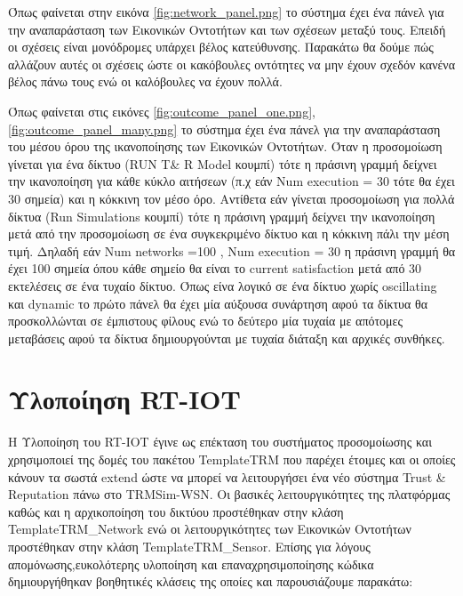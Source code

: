 Όπως φαίνεται στην εικόνα \ref{fig:network_panel.png} το σύστημα έχει ένα πάνελ για την αναπαράσταση των Εικονικών Οντοτήτων και των σχέσεων μεταξύ τους. Επειδή οι σχέσεις είναι μονόδρομες υπάρχει βέλος κατεύθυνσης. Παρακάτω θα δούμε πώς αλλάζουν αυτές οι σχέσεις ώστε οι κακόβουλες οντότητες να μην έχουν σχεδόν κανένα βέλος πάνω τους ενώ οι καλόβουλες να έχουν πολλά.

\newpage
Όπως φαίνεται στις εικόνες \ref{fig:outcome_panel_one.png}, \ref{fig:outcome_panel_many.png} το σύστημα έχει ένα πάνελ για την αναπαράσταση του μέσου όρου της ικανοποίησης των Εικονικών Οντοτήτων. Όταν η προσομοίωση γίνεται για ένα δίκτυο (RUN T\& R Model κουμπί) τότε η πράσινη γραμμή δείχνει την ικανοποίηση για κάθε κύκλο αιτήσεων (π.χ εάν Num execution = 30 τότε θα έχει 30 σημεία) και η κόκκινη τον μέσο όρο. Αντίθετα εάν γίνεται προσομοίωση για πολλά δίκτυα (Run Simulations κουμπί) τότε η πράσινη γραμμή δείχνει την ικανοποίηση μετά από την προσομοίωση σε ένα συγκεκριμένο δίκτυο και η κόκκινη πάλι την μέση τιμή. Δηλαδή εάν Num networks =100 , Num execution = 30 η πράσινη γραμμή θα έχει 100 σημεία όπου κάθε σημείο θα είναι το current satisfaction μετά από 30 εκτελέσεις σε ένα τυχαίο δίκτυο. Όπως είνα λογικό σε ένα δίκτυο χωρίς oscillating και dynamic το πρώτο πάνελ θα έχει μία αύξουσα συνάρτηση αφού τα δίκτυα θα προσκολλώνται σε έμπιστους φίλους ενώ το δεύτερο μία τυχαία με απότομες μεταβάσεις αφού τα δίκτυα δημιουργούνται με τυχαία διάταξη και αρχικές συνθήκες.



\newpage
\section{Υλοποίηση RT-IOT}

Η Υλοποίηση του RT-IOT έγινε ως επέκταση του συστήματος προσομοίωσης και χρησιμοποιεί της δομές του πακέτου TemplateTRM που παρέχει έτοιμες και οι οποίες κάνουν τα σωστά extend ώστε να μπορεί να λειτουργήσει ένα νέο σύστημα Trust \& Reputation πάνω στο TRMSim-WSN. Οι βασικές λειτουργικότητες της πλατφόρμας καθώς και η αρχικοποίηση του δικτύου προστέθηκαν στην κλάση TemplateTRM\_Network ενώ οι λειτουργικότητες των Εικονικών Οντοτήτων προστέθηκαν στην κλάση TemplateTRM\_Sensor. Επίσης για λόγους απομόνωσης,ευκολότερης υλοποίηση και επαναχρησιμοποίησης κώδικα δημιουργήθηκαν βοηθητικές κλάσεις της οποίες και παρουσιάζουμε παρακάτω:

